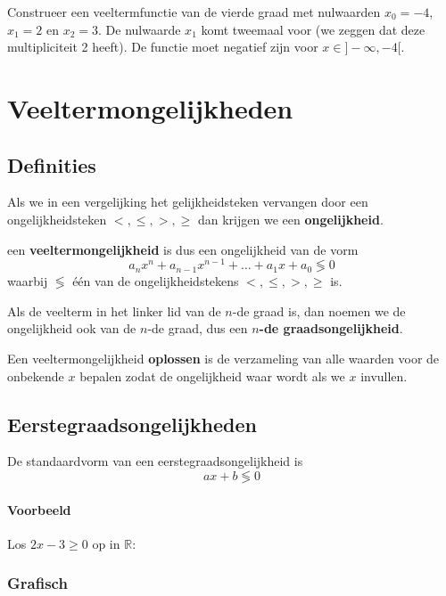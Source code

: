 \documentclass[12pt,twoside,a4paper]{article}
\begin{document}
\begin{oefening}
Construeer een veeltermfunctie van de vierde graad met nulwaarden $x_0=-4$, $x_1=2$ en $x_2=3$. De nulwaarde $x_1$ komt tweemaal voor (we zeggen dat deze multipliciteit 2 heeft). De functie moet negatief zijn voor $x\in]-\infty,-4[$.
\end{oefening}

\cleardoublepage
\section{Veeltermongelijkheden}

\subsection{Definities}

Als we in een vergelijking het gelijkheidsteken vervangen door een ongelijkheidsteken $<, \leq, >, \geq$ dan krijgen we een {\bf ongelijkheid}.

een {\bf veeltermongelijkheid} is dus een ongelijkheid van de vorm
\[a_nx^n+a_{n-1}x^{n-1}+ \ldots + a_1x+a_0 \lessgtr 0 \]
waarbij $\lessgtr$ één van de ongelijkheidstekens $<, \leq, >, \geq$ is.

Als de veelterm in het linker lid van de $n$-de graad is, dan noemen we de ongelijkheid ook van de $n$-de graad, dus een {\bf $n$-de graadsongelijkheid}.

Een veeltermongelijkheid {\bf oplossen} is de verzameling van alle waarden voor de onbekende $x$ bepalen zodat de ongelijkheid waar wordt als we $x$ invullen.

\subsection{Eerstegraadsongelijkheden}

De standaardvorm van een eerstegraadsongelijkheid is
\[ax + b \lessgtr 0\]

\paragraph*{Voorbeeld}

Los $2x-3 \geq 0$ op in $\mathbb{R}$:

\subsubsection*{Grafisch}
\end{document}
